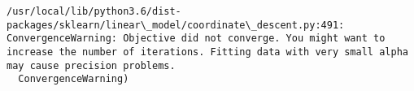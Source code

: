 \documentclass[10pt, t]{beamer}
\begin{document}
    \begin{Verbatim}[commandchars=\\\{\}]
/usr/local/lib/python3.6/dist-packages/sklearn/linear\_model/coordinate\_descent.py:491: ConvergenceWarning: Objective did not converge. You might want to increase the number of iterations. Fitting data with very small alpha may cause precision problems.
  ConvergenceWarning)

    \end{Verbatim}

    \begin{center}
    \end{center}
    { \hspace*{\fill} \\}
    
    \begin{center}
    \end{center}
    { \hspace*{\fill} \\}
    
    \begin{center}
    \end{center}
    { \hspace*{\fill} \\}
    
    \begin{center}
    \end{center}
    { \hspace*{\fill} \\}
    
    \begin{center}
    \end{center}
    { \hspace*{\fill} \\}
    
    \begin{center}
    \end{center}
    { \hspace*{\fill} \\}
    
    \begin{center}
    \end{center}
    { \hspace*{\fill} \\}
    
\end{document}
